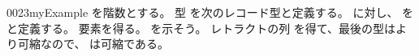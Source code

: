 \documentclass[index]{subfiles}
\begin{document}
\StartDefiningTabulars
\begin{myBlock}{0023}{myExample}
  を階数とする。
  型
  を次のレコード型と定義する。
  に対し、
  を
  と定義する。
  要素を得る。
  を示そう。
  レトラクトの列
  を得て、最後の型はより可縮なので、
  は可縮である。
\end{myBlock}
\StopDefiningTabulars
\end{document}
